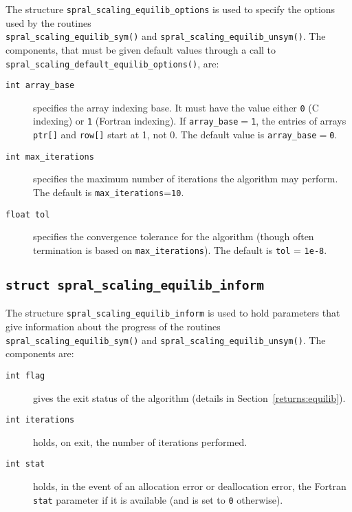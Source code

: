 The structure \texttt{spral\_scaling\_equilib\_options} is used to specify the options
used by the routines \\\texttt{spral\_scaling\_equilib\_sym()} and \texttt{spral\_scaling\_equilib\_unsym()}. The components, that
must be given default values through a call to \texttt{spral\_scaling\_default\_equilib\_options()}, are:

\begin{description}

\item[\texttt{int array\_base}] specifies the array indexing base. It must
   have the value either \texttt{0} (C indexing) or \texttt{1} (Fortran
   indexing). If \texttt{array\_base}$=$\texttt{1}, the entries of arrays
   \texttt{ptr[]} and \texttt{row[]} start at 1, not 0.
   The default value is \texttt{array\_base}$=$\texttt{0}.

\item[\texttt{int max\_iterations}] specifies the maximum number of iterations the algorithm may perform. The default is \texttt{max\_iterations}=\texttt{10}.

\item[\texttt{float tol}] specifies the convergence tolerance for the algorithm (though often termination is based on \texttt{max\_iterations}). The default is \texttt{tol} = \texttt{1e-8}.

\end{description}

\subsection{\texttt{struct spral\_scaling\_equilib\_inform}} \label{type:equilib_inform}

The structure \texttt{spral\_scaling\_equilib\_inform} is used to hold parameters that
give information about the progress of the routines
\texttt{spral\_scaling\_equilib\_sym()} and \texttt{spral\_scaling\_equilib\_unsym()}. The components are:

\begin{description}

\item[\texttt{int flag}] gives the exit status of the algorithm (details in Section~\ref{returns:equilib}).

\item[\texttt{int iterations}]  holds, on exit,
   the number of iterations performed.

\item[\texttt{int stat}] holds, in the event of an allocation error or deallocation error, the Fortran \texttt{stat} parameter if it is available (and is set to \texttt{0} otherwise).

\end{description}

